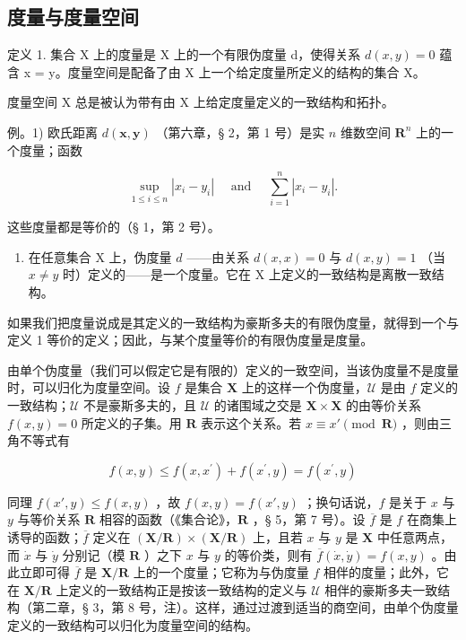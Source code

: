\subsection{度量与度量空间}

定义 1. 集合 X 上的度量是 X 上的一个有限伪度量 d，使得关系 \(d(x, y) = 0\) 蕴含 x = y。度量空间是配备了由 X 上一个给定度量所定义的结构的集合 X。

度量空间 X 总是被认为带有由 X 上给定度量定义的一致结构和拓扑。

例。1) 欧氏距离 \(d(\pmb{x}, \pmb{y})\) （第六章，§ 2，第 1 号）是实 \(n\) 维数空间 \(\mathbf{R}^n\) 上的一个度量；函数

\[
\sup _ {1 \leqslant i \leqslant n} | x _ {i} - y _ {i} | \quad \text { and } \quad \sum_ {i = 1} ^ {n} | x _ {i} - y _ {i} |.
\]

这些度量都是等价的（§ 1，第 2 号）。

\begin{enumerate}
\def\labelenumi{\arabic{enumi})}
\setcounter{enumi}{1}
\tightlist
\item
  在任意集合 X 上，伪度量 \(d\) ——由关系 \(d(x, x) = 0\) 与 \(d(x, y) = 1\) （当 \(x \neq y\) 时）定义的——是一个度量。它在 X 上定义的一致结构是离散一致结构。
\end{enumerate}

如果我们把度量说成是其定义的一致结构为豪斯多夫的有限伪度量，就得到一个与定义 1 等价的定义；因此，与某个度量等价的有限伪度量是度量。

由单个伪度量（我们可以假定它是有限的）定义的一致空间，当该伪度量不是度量时，可以归化为度量空间。设 \(f\) 是集合 \(\mathbf{X}\) 上的这样一个伪度量，\(\mathcal{U}\) 是由 \(f\) 定义的一致结构；\(\mathcal{U}\) 不是豪斯多夫的，且 \(\mathcal{U}\) 的诸围域之交是 \(\mathbf{X} \times \mathbf{X}\) 的由等价关系 \(f(x,y) = 0\) 所定义的子集。用 \(\mathbf{R}\) 表示这个关系。若 \(x \equiv x' \pmod{\mathbf{R}}\) ，则由三角不等式有

\[
f (x, y) \leqslant f (x, x ^ {\prime}) + f (x ^ {\prime}, y) = f (x ^ {\prime}, y)
\]

同理 \(f(x', y) \leqslant f(x, y)\) ，故 \(f(x, y) = f(x', y)\) ；换句话说，\(f\) 是关于 \(x\) 与 \(y\) 与等价关系 \(\mathbf{R}\) 相容的函数（《集合论》，\(\mathbf{R}\) ，§ 5，第 7 号）。设 \(\overline{f}\) 是 \(f\) 在商集上诱导的函数；\(\overline{f}\) 定义在 \((\mathbf{X}/\mathbf{R}) \times (\mathbf{X}/\mathbf{R})\) 上，且若 \(x\) 与 \(y\) 是 \(\mathbf{X}\) 中任意两点，而 \(\dot{x}\) 与 \(\dot{y}\) 分别记（模 \(\mathbf{R}\) ）之下 \(x\) 与 \(y\) 的等价类，则有 \(\overline{f}(\dot{x}, \dot{y}) = f(x, y)\) 。由此立即可得 \(\overline{f}\) 是 \(\mathbf{X}/\mathbf{R}\) 上的一个度量；它称为与伪度量 \(f\) 相伴的度量；此外，它在 \(\mathbf{X}/\mathbf{R}\) 上定义的一致结构正是按该一致结构的定义与 \(\mathcal{U}\) 相伴的豪斯多夫一致结构（第二章，§ 3，第 8 号，注）。这样，通过过渡到适当的商空间，由单个伪度量定义的一致结构可以归化为度量空间的结构。

